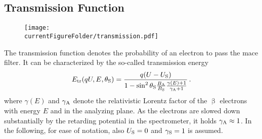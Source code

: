 \subsection{Transmission Function}
\label{sec:intSpecModelResponseTransmission}
\begin{figure}
	\centering
	\texttt{[image: \\currentFigureFolder/transmission.pdf]}
	\label{fig:intSpecModelTransmission}
\end{figure}
The transmission function denotes the probability of an electron to pass the \gls{mace} filter. It can be characterized by the so-called transmission energy~\cite{Groh2015}
\begin{equation}
\label{eq:intSpecModelTransmissionEnergy}
E_\mathrm{tr}(qU,E,\theta_\mathrm{S}) = 
\frac{
	q(U-U_\mathrm{S})
}{
	1-\sin^2\theta_\mathrm{S} \frac{B_\mathrm{A}}{B_\mathrm{S}} \frac{\gamma(E)+1}{\gamma_\mathrm{A}+1}
}
\text{\,.}
\end{equation}
where $\gamma(E)$ and $\gamma_\mathrm{A}$ denote the relativistic Lorentz factor of the $\upbeta$ electrons with energy $E$ and in the analyzing plane. As the electrons are slowed down substantially by the retarding potential in the spectrometer, it holds $\gamma_\mathrm{A}\approx1$. In the following, for ease of notation, also $U_\mathrm{S}=0$ and $\gamma_\mathrm{S}=1$ is assumed.


